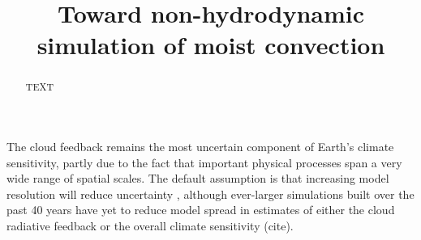 \documentclass[acp, manuscript, english]{copernicus}
\begin{document}
\title{Toward non-hydrodynamic simulation of moist convection}



\Author[]{}{}
\Author[]{}{}













\received{}
\pubdiscuss{} %
\revised{}
\accepted{}
\published{}




\maketitle



\begin{abstract}
TEXT
\end{abstract}




\introduction  %

The cloud feedback remains the most uncertain component of Earth's climate sensitivity, partly due to the fact that important physical processes span a very wide range of spatial scales. The default assumption is that increasing model resolution will reduce uncertainty \citep{shukla2009, slingo2022}, although ever-larger simulations built over the past 40 years have yet to reduce model spread in estimates of either the cloud radiative feedback \citep{ipcc6,ceppi2017} or the overall climate sensitivity (cite). %
\end{document}
